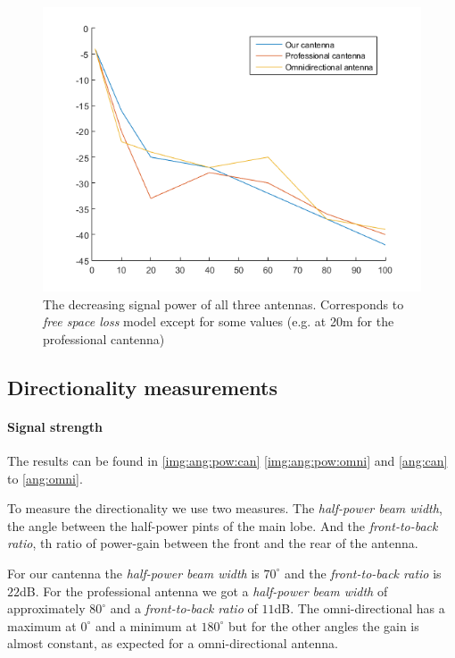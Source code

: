 \documentclass[12pt,a4paper]{article}
\begin{document}
		
	
		\begin{figure}
			\includegraphics[width=\textwidth]{plots/all_power.png}
			\caption{The decreasing signal power of all three antennas. Corresponds to \emph{free space loss} model except for some values (e.g. at 20m for the professional cantenna)}
			\label{all:power}
		\end{figure}

	\subsection{Directionality measurements}
		\paragraph{Signal strength} The results can be found in \autoref{img:ang:pow:can} \autoref{img:ang:pow:omni} and \autoref{ang:can} to \autoref{ang:omni}.
		
		To measure the directionality we use two measures. The \emph{half-power beam width}, the angle between the half-power pints of the main lobe.
		And the \emph{front-to-back ratio}, th ratio of power-gain between the front and the rear of the antenna.
		
		
		For our cantenna the \emph{half-power beam width} is $70^{\circ}$ and the \emph{front-to-back ratio} is $22$dB. For the professional antenna we got a \emph{half-power beam width} of approximately $80^{\circ}$ and a \emph{front-to-back ratio} of $11$dB.
		The omni-directional has a maximum at $0^{\circ}$ and a minimum at $180^{\circ}$ but for the other angles the gain is almost constant, as expected for a omni-directional antenna.
		
\end{document}
